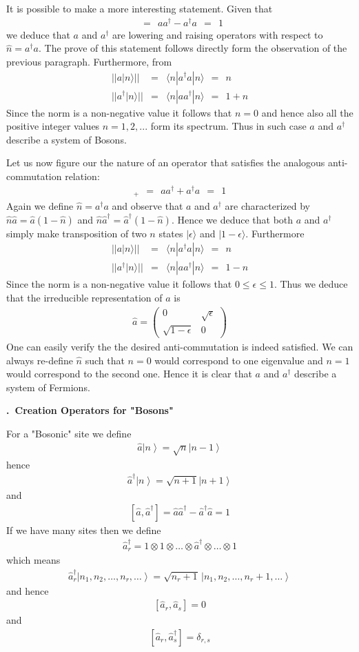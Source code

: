 \documentclass[onecolumn,fleqn, 11pt]{revtex4}
\newcommand{\beq}{\begin{eqnarray}}
\newcommand{\eeq}{\end{eqnarray}}
\renewcommand{\thesubsection}{\arabic{subsection}}
\renewcommand{\thesubsubsection}{\arabic{subsubsection}}
\newcommand{\sheadC}[1]
{
\addtocounter{subsubsection}{1}
\vspace{5mm}
{\bf \thesubsection.\thesubsubsection \ #1}  
\nopagebreak
\phantomsection
}
\begin{document}
It is possible to make a more 
interesting statement. Given that 
\beq
[a,a^{\dag}] \ \ = \ \ aa^{\dag}-a^{\dag}a \ \ = \ \  1
\eeq
we deduce that $a$ and $a^{\dag}$ 
are lowering and raising operators 
with respect to $\hat{n}=a^{\dag}a$.
The prove of this statement 
follows directly form the observation 
of the previous paragraph.
Furthermore, from 
\beq
|| a|n\rangle || &=& \langle n| a^{\dag} a |n\rangle  \ \ = \ \ n
\\ 
|| a^{\dag} |n\rangle || &=& \langle n| a a^{\dag} |n\rangle  \ \ = \ \ 1 + n
\eeq
Since the norm is a non-negative value it follows 
that $n=0$ and hence also all the positive 
integer values $n=1,2,...$ form its spectrum. 
Thus in such case $a$ and $a^{\dag}$  
describe a system of Bosons.


Let us now figure our the nature of 
an operator that satisfies the analogous 
anti-commutation relation:
\beq
[a,a^{\dag}]_{+} \ \ = \ \ aa^{\dag}+a^{\dag}a \ \ = \ \  1
\eeq
Again we define $\hat{n}=a^{\dag}a$
and observe that $a$ and $a^{\dag}$ are characterized 
by ${\hat{n}\hat{a} = \hat{a}(1-\hat{n})}$
and ${\hat{n}\hat{a}^{\dag} = \hat{a}^{\dag}(1-\hat{n})}$. 
Hence we deduce that both $a$ and $a^{\dag}$ 
simply make transposition of two $n$ 
states ${|\epsilon\rangle}$ and ${|1{-}\epsilon\rangle}$. 
Furthermore 
\beq
|| a|n\rangle || &=& \langle n| a^{\dag} a |n\rangle  \ \ = \ \ n
\\ 
|| a^{\dag} |n\rangle || &=& \langle n| a a^{\dag} |n\rangle  \ \ = \ \ 1 - n
\eeq
Since the norm is a non-negative value 
it follows that ${0\le\epsilon\le1}$. 
Thus we deduce that the irreducible 
representation of $a$ is 
\beq
\hat{a}= 
\begin{pmatrix} 
0 & \sqrt{\epsilon}\\ 
\sqrt{1{-}\epsilon} & 0 
\end{pmatrix} 
\eeq
One can easily verify the the desired 
anti-commutation is indeed satisfied.
We can always re-define $\hat{n}$ 
such that ${n{=}0}$ would correspond 
to one eigenvalue and ${n{=}1}$ 
would correspond to the second one. 
Hence it is clear that $a$ and $a^{\dag}$  
describe a system of Fermions.


\sheadC{Creation Operators for "Bosons"} 

For a "Bosonic" site we define 
\beq
\hat{a}\left\vert n\right\rangle =\sqrt{n}\left\vert n-1\right\rangle 
\eeq
hence
\beq
\hat{a}^{\dag}\left\vert n\right\rangle =\sqrt{n+1}\left\vert 
n+1\right\rangle 
\eeq
and
\beq
\left[ \hat{a},\hat{a}^{\dag}\right] 
=\hat{a}\hat{a}^{\dag}-\hat{a}^{\dag}\hat{a}=1
\eeq
If we have many sites then we define
\beq
\hat{a}_{r}^{\dag}
=1\otimes1\otimes \dots \otimes\hat{a}^{\dag}\otimes  \dots \otimes1
\eeq
which means 
\beq
\hat{a}_{r}^{\dag}\left\vert n_{1},n_{2}, \dots ,n_{r},\dots \right\rangle 
=\sqrt{n_{r}+1} \, \left\vert n_{1},n_{2}, \dots ,n_{r}+1,\dots \right\rangle 
\eeq
and hence
\beq
\left[  \hat{a}_{r},\hat{a}_{s}\right] =0 
\eeq
and
\beq
\left[  \hat{a}_{r},\hat{a}_{s}^{\dag} \right] = \delta_{r,s} 
\eeq
\end{document}
